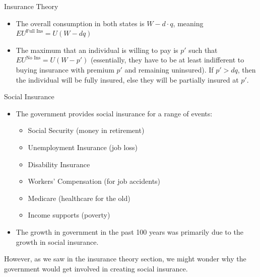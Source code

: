 \documentclass[8pt]{extarticle}
\begin{document}
\begin{problem}{Insurance Theory}
\begin{center}
    \end{center}
    \begin{itemize}
      \item The overall consumption in both states is $W - d\cdot q$, meaning $EU^{\text{Full Ins}} = U(W-dq)$
      \item The maximum that an individual is willing to pay is  $p'$ such that $EU^{\text{No Ins}} = U(W - p')$ (essentially, they have to be at least indifferent to buying insurance with premium $p'$ and remaining uninsured). If $p' > dq$, then the individual will be fully insured, else they will be partially insured at $p'$.
    \end{itemize}
  \end{problem}
  \begin{problem}{Social Insurance}
    \begin{itemize}
      \item The government provides social insurance for a range of events:
        \begin{itemize}
          \item Social Security (money in retirement)
          \item Unemployment Insurance (job loss)
          \item Disability Insurance
          \item Workers' Compensation (for job accidents)
          \item Medicare (healthcare for the old)
          \item Income supports (poverty)
        \end{itemize}
      \item The growth in government in the past 100 years was primarily due to the growth in social insurance.
    \end{itemize}
    However, as we saw in the insurance theory section, we might wonder why the government would get involved in creating social insurance.\\


\end{problem}
\end{document}
